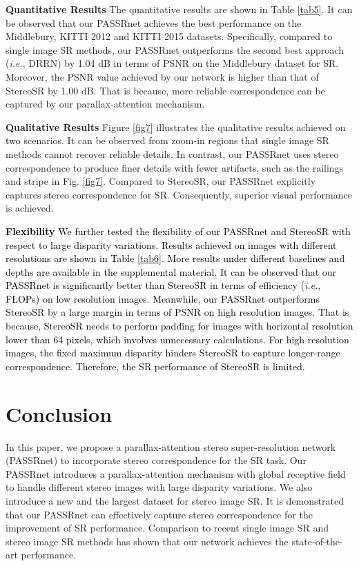 \documentclass[10pt,twocolumn,letterpaper]{article}
\begin{document}
\noindent
\textbf{Quantitative Results}
The quantitative results are shown in Table \ref{tab5}. It can be observed that our PASSRnet achieves the best performance on the Middlebury, KITTI 2012 and KITTI 2015 datasets. Specifically, compared to single image SR methods, our PASSRnet outperforms the second best approach (\emph{i.e.}, DRRN) by 1.04 dB in terms of PSNR on the Middlebury dataset for  SR. Moreover, the PSNR value achieved by our network is higher than that of StereoSR by 1.00 dB. That is because, more reliable correspondence can be captured by our parallax-attention mechanism. 

\noindent
\textbf{Qualitative Results}
Figure \ref{fig7} illustrates the qualitative results achieved on \textcolor{black}{two} scenarios. It can be observed from zoom-in regions that single image SR methods cannot recover reliable details. In contrast, our PASSRnet uses stereo correspondence to produce finer details with fewer artifacts, such as the railings and stripe in Fig. \ref{fig7}. Compared to StereoSR, our PASSRnet explicitly captures stereo correspondence for SR. Consequently, superior visual performance is achieved.

\noindent
\textcolor{black}{
	\textbf{Flexibility}
	We further tested the flexibility of our PASSRnet and StereoSR \cite{2018-EnhancingtheSpatialResolutionofStereoImagesUsingaParallaxPrior-Jeon--} with respect to large disparity variations. Results achieved on images with different resolutions are shown in Table \ref{tab6}. More results under different baselines and depths are  available in the supplemental material. It can be observed that our PASSRnet is significantly better than StereoSR in terms of efficiency (\emph{i.e.}, FLOPs) on low resolution images. Meanwhile, our PASSRnet outperforms StereoSR by a large margin in terms of PSNR on high resolution images. That is because, StereoSR needs to perform padding for images with horizontal resolution lower than 64 pixels, which involves unnecessary calculations. For high resolution images, the fixed maximum disparity hinders StereoSR to capture longer-range correspondence. Therefore, the SR performance of StereoSR is limited.
}

\section{Conclusion}
In this paper, we propose a parallax-attention stereo super-resolution network (PASSRnet) to incorporate stereo correspondence for the SR task. Our PASSRnet introduces a parallax-attention mechanism with global receptive field to handle different stereo images with large disparity variations. We also introduce a new and the largest dataset for stereo image SR. It is demonstrated that our PASSRnet can effectively capture stereo correspondence for the improvement of SR performance. Comparison to recent single image SR and stereo image SR methods has shown that our network achieves the state-of-the-art performance.
\end{document}
